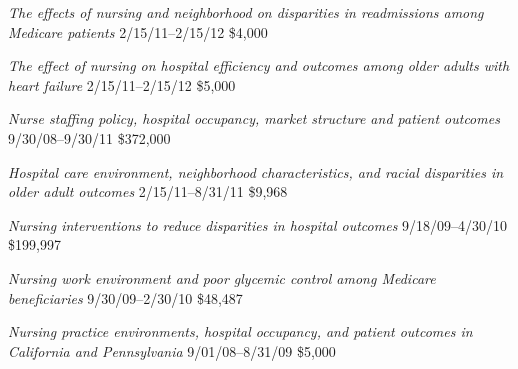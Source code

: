 \documentclass[10pt,]{article}
\begin{document}
{{{{{{{{{{{{{{\textit {The effects of nursing and neighborhood on disparities in readmissions among Medicare patients} \hfill 2/15/11--2/15/12 \newline
{}	\hfill \$4,000

\textit {The effect of nursing on hospital efficiency and outcomes among older adults with heart failure} \hfill 2/15/11--2/15/12 \newline
{}	\hfill \$5,000

\textit {Nurse staffing policy, hospital occupancy, market structure and patient outcomes} \hfill 9/30/08--9/30/11 \newline
{}	\hfill \$372,000

\textit {Hospital care environment, neighborhood characteristics, and racial disparities in older adult outcomes} \hfill 2/15/11--8/31/11 \newline
{}	\hfill \$9,968

\textit {Nursing interventions to reduce disparities in hospital outcomes} \hfill 9/18/09--4/30/10 \newline
{}	\hfill \$199,997

\textit {Nursing work environment and poor glycemic control among Medicare beneficiaries} \hfill 9/30/09--2/30/10 \newline
{}	\hfill \$48,487

\textit {Nursing practice environments, hospital occupancy, and patient outcomes in California and Pennsylvania} \hfill 9/01/08--8/31/09 \newline
{} \hfill \$5,000

}}}}}}}}}}}}}}
\end{document}
